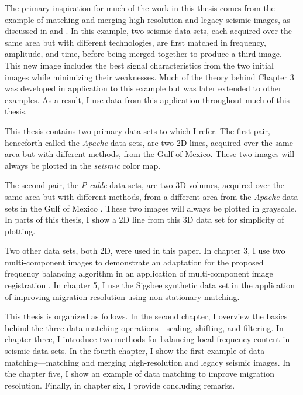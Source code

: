 The primary inspiration for much of the work in this thesis comes from the example of matching and merging high-resolution and legacy seismic images, as discussed in \cite{merge2} and \cite{merge}.
In this example, two seismic data sets, each acquired over the same area but with different technologies, are first matched in frequency, amplitude, and time, before being merged together to produce a third image.
This new image includes the best signal characteristics from the two initial images while minimizing their weaknesses.
Much of the theory behind Chapter 3 was developed in application to this example but was later extended to other examples.
As a result, I use data from this application throughout much of this thesis.

This thesis contains two primary data sets to which I refer. 
The first pair, henceforth called the {\it Apache} data sets, are two 2D lines, acquired over the same area but with different methods, from the Gulf of Mexico. 
These two images will always be plotted in the {\em seismic} color map.

The second pair, the {\em P-cable} data sets, are two 3D volumes, acquired over the same area but with different methods, from a different area from the {\em Apache} data sets in the Gulf of Mexico \cite[]{pcable,data}.
These two images will always be plotted in grayscale.
In parts of this thesis, I show a 2D line from this 3D data set for simplicity of plotting.

Two other data sets, both 2D, were used in this paper. 
In chapter 3, I use two multi-component images to demonstrate an adaptation for the proposed frequency balancing algorithm in an application of multi-component image registration \cite[]{attr}.
In chapter 5, I use the Sigsbee synthetic data set \cite[]{sigsbee} in the application of improving migration resolution using non-stationary matching.

This thesis is organized as follows.
In the second chapter, I overview the basics behind the three data matching operations---scaling, shifting, and filtering.
In chapter three, I introduce two methods for balancing local frequency content in seismic data sets.
In the fourth chapter, I show the first example of data matching---matching and merging high-resolution and legacy seismic images.
In the chapter five, I show an example of data matching to improve migration resolution.
Finally, in chapter six, I provide concluding remarks.

